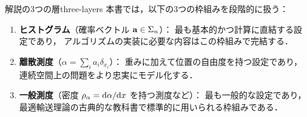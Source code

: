 \begin{remark}{解説の3つの層}{three-layers}
  本書では，以下の3つの枠組みを段階的に扱う：
  \begin{enumerate}
    \item \textbf{ヒストグラム}（確率ベクトル $\mathbf{a} \in \Sigma_n$）：
      最も基本的かつ計算に直結する設定であり，
      アルゴリズムの実装に必要な内容はこの枠組みで完結する．
    \item \textbf{離散測度}（$\alpha = \sum_i a_i \delta_{x_i}$）：
      重みに加えて位置の自由度を持つ設定であり，
      連続空間上の問題をより忠実にモデル化する．
    \item \textbf{一般測度}（密度 $\rho_\alpha = \mathrm{d}\alpha / \mathrm{d} x$ を持つ測度など）：
      最も一般的な設定であり，
      最適輸送理論の古典的な教科書で標準的に用いられる枠組みである．
  \end{enumerate}
\end{remark}
